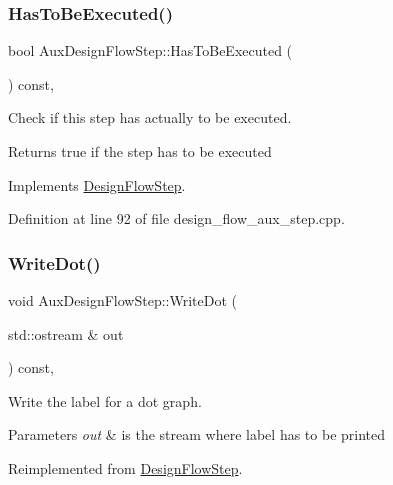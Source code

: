 \subsubsection{\texorpdfstring{Has\+To\+Be\+Executed()}{HasToBeExecuted()}}
{\footnotesize\ttfamily bool Aux\+Design\+Flow\+Step\+::\+Has\+To\+Be\+Executed (\begin{DoxyParamCaption}{ }\end{DoxyParamCaption}) const\hspace{0.3cm}{\ttfamily [override]}, {\ttfamily [virtual]}}



Check if this step has actually to be executed. 

\begin{DoxyReturn}{Returns}
true if the step has to be executed 
\end{DoxyReturn}


Implements \hyperlink{classDesignFlowStep_a1783abe0c1d162a52da1e413d5d1ef05}{Design\+Flow\+Step}.



Definition at line 92 of file design\+\_\+flow\+\_\+aux\+\_\+step.\+cpp.

\mbox{\label{classAuxDesignFlowStep_acb3ca20dd02fa5e910b22c19a4d5f9c6}} 
\subsubsection{\texorpdfstring{Write\+Dot()}{WriteDot()}}
{\footnotesize\ttfamily void Aux\+Design\+Flow\+Step\+::\+Write\+Dot (\begin{DoxyParamCaption}\item[{std\+::ostream \&}]{out }\end{DoxyParamCaption}) const\hspace{0.3cm}{\ttfamily [override]}, {\ttfamily [virtual]}}



Write the label for a dot graph. 


\begin{DoxyParams}{Parameters}
{\em out} & is the stream where label has to be printed \\
\hline
\end{DoxyParams}


Reimplemented from \hyperlink{classDesignFlowStep_a1562bb503d9b9f2a2a059041d79043c6}{Design\+Flow\+Step}.



